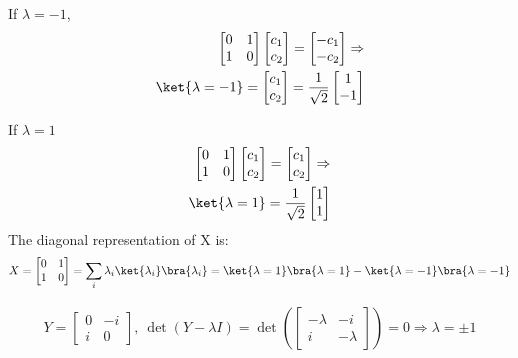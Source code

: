 \documentclass[a4paper,12pt]{article}
\begin{document}
If $\lambda = -1$,
\begin{align*}
	\begin{bmatrix}
		0 & 1 \\
		1 & 0
	\end{bmatrix}
	\begin{bmatrix}
		c_1 \\
		c_2
	\end{bmatrix} =
	\begin{bmatrix}
		-c_1 \\
		-c_2
	\end{bmatrix}
	\Rightarrow \\ \ket{\lambda = -1} = \begin{bmatrix}
	c_1 \\
	c_2
	\end{bmatrix} = \frac{1}{\sqrt{2}}
	\begin{bmatrix}
	1 \\
	-1
	\end{bmatrix}
\end{align*}

If $\lambda = 1$
\begin{align*}
        \begin{bmatrix}
		0 & 1 \\
		1 & 0
	\end{bmatrix}
	\begin{bmatrix}
		c_1 \\
		c_2
	\end{bmatrix} =
	\begin{bmatrix}
		c_1 \\
		c_2
	\end{bmatrix}
	\Rightarrow \\ \ket{\lambda = 1} = \frac{1}{\sqrt{2}}
	\begin{bmatrix}
	1 \\
	1
	\end{bmatrix}
\end{align*}
The diagonal representation of X is:
\begin{align*}
	X = \begin{bmatrix}
	0 & 1 \\
	1 & 0
	\end{bmatrix}
	= \sum_i \lambda_i \ket{\lambda_i}\bra{\lambda_i}= \ket{\lambda=1}\bra{\lambda=1}-\ket{\lambda=-1}\bra{\lambda=-1}
\end{align*}


\begin{align*}
	Y = \begin{bmatrix}
	0 & -i \\
	i & 0
	\end{bmatrix},\ \det(Y-\lambda I) =
	\det \left(\begin{bmatrix}
	-\lambda & -i \\
	i & -\lambda
	\end{bmatrix} \right) = 0 \Rightarrow \lambda = \pm 1
\end{align*}
\end{document}

